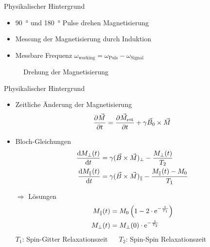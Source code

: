\begin{frame}{Physikalischer Hintergrund}
	\begin{itemize}
	\item \SI{90}{\degree} und \SI{180}{\degree} Pulse drehen Magnetisierung
	\item Messung der Magnetisierung durch Induktion
	\item Messbare Frequenz $\omega_\text{working}=\omega_\text{Puls}-\omega_\text{Signal}$
	\end{itemize}
	\begin{figure}
	\centering
	
	\caption{Drehung der Magnetisierung}
	\end{figure}
\end{frame}

\begin{frame}{Physikalischer Hintergrund}
	\begin{itemize}
	\item Zeitliche Änderung der Magnetisierung
		\begin{align*}
		\pdv{\vec{M}}{t}=\pdv{\vec{M}_\text{rot}}{t}+\gamma\vec{B}_0\times\vec{M}
		\end{align*}
	\item Bloch-Gleichungen
		\begin{align*}
		\dv{M_\bot(t)}{t}&=\gamma(\vec{B}\times\vec{M})_\bot-\frac{M_\bot(t)}{T_2}\\
		\dv{M_\parallel(t)}{t}&=\gamma(\vec{B}\times\vec{M})_\parallel-\frac{M_\parallel(t)-M_0}{T_1}
		\end{align*}
	\item[$\Rightarrow$] Lösungen
		\begin{align*}
		M_\parallel (t)&=M_0\left(1-2\cdot\mathrm{e}^{-\frac{t}{T_1}}\right)\\
		M_\bot(t)&=M_\bot(0)\cdot\mathrm{e}^{-\frac{t}{T_2}}
		\end{align*}
	$T_{1}$: Spin-Gitter Relaxationszeit $\quad$ $T_{2}$: Spin-Spin Relaxationszeit
	\end{itemize}
\end{frame}

